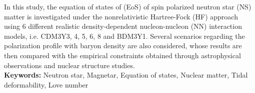 In this study, the equation of states of (\gls{EoS}) of spin polarized neutron star (\gls{NS}) matter is investigated under the nonrelativistic Hartree-Fock (\gls{HF}) approach using 6 different realistic density-dependent nucleon-nucleon (\gls{NN}) interaction models, i.e. CDM3Y3, 4, 5, 6, 8 and BDM3Y1. Several scenarios regarding the polarization profile with baryon density are also considered, whose results are then compared with the empirical constraints obtained through astrophysical observations and nuclear structure studies.\\[5mm]
\textbf{Keywords:} Neutron star, Magnetar, Equation of states, Nuclear matter, Tidal deformability, Love number
